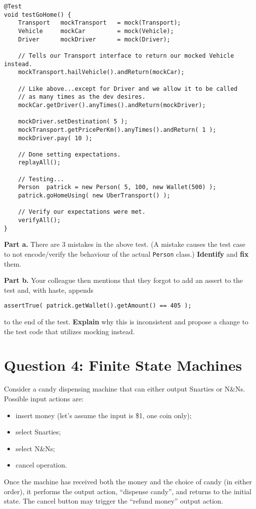 \documentclass[12pt]{article}
\begin{document}
\begin{lstlisting}
@Test
void testGoHome() {
    Transport   mockTransport   = mock(Transport);
    Vehicle     mockCar         = mock(Vehicle);
    Driver      mockDriver      = mock(Driver);

    // Tells our Transport interface to return our mocked Vehicle instead.
    mockTransport.hailVehicle().andReturn(mockCar);

    // Like above...except for Driver and we allow it to be called
    // as many times as the dev desires.
    mockCar.getDriver().anyTimes().andReturn(mockDriver);

    mockDriver.setDestination( 5 );
    mockTransport.getPricePerKm().anyTimes().andReturn( 1 );
    mockDriver.pay( 10 );

    // Done setting expectations.
    replayAll();

    // Testing...
    Person  patrick = new Person( 5, 100, new Wallet(500) );
    patrick.goHomeUsing( new UberTransport() );

    // Verify our expectations were met.
    verifyAll();
}
\end{lstlisting}
{\bf Part a.} There are 3 mistakes in the above test. (A mistake causes the test case to not
encode/verify the behaviour of the actual {\tt Person} class.) {\bf Identify} and {\bf fix} them.

\noindent
{\bf Part b.} Your colleague then mentions that they forgot to add an assert to the test and, with haste, appends
\begin{lstlisting}[numbers=none]
    assertTrue( patrick.getWallet().getAmount() == 405 );
\end{lstlisting}
to the end of the test. {\bf Explain} why this is inconsistent and propose a change to the test code that utilizes mocking instead.

\section*{Question 4: Finite State Machines}
Consider a candy dispensing machine that can either output Snarties or N\&Ns.
Possible input actions are:
\begin{itemize}[noitemsep]
\item insert money (let's assume the input is \$1, one coin only);
\item select Snarties;
\item select N\&Ns;
\item cancel operation.
\end{itemize}
Once the machine has received both the money and the choice of candy
(in either order), it performs the output action, ``dispense
candy'', and returns to the initial state. The cancel button may trigger the ``refund money'' output
action.
\end{document}
